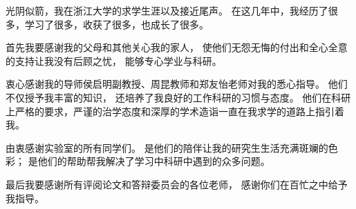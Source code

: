 \begin{thanks}
光阴似箭，我在浙江大学的求学生涯以及接近尾声。
在这几年中，我经历了很多，学习了很多，收获了很多，也成长了很多。

首先我要感谢我的父母和其他关心我的家人，
使他们无怨无悔的付出和全心全意的支持让我没有后顾之忧，
能够专心学业与科研。

衷心感谢我的导师侯启明副教授、周昆教师和郑友怡老师对我的悉心指导。
他们不仅授予我丰富的知识，
还培养了我良好的工作科研的习惯与态度。
他们在科研上严格的要求，严谨的治学态度和深厚的学术造诣一直在我求学的道路上指引着我。

由衷感谢实验室的所有同学们。
是他们的陪伴让我的研究生生活充满斑斓的色彩；
是他们的帮助帮我解决了学习中科研中遇到的众多问题。

最后我要感谢所有评阅论文和答辩委员会的各位老师，
感谢你们在百忙之中给予我指导。
\end{thanks}
